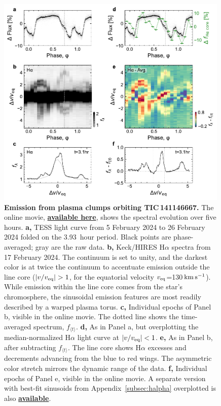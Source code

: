 \documentclass[11pt,twocolumn,tighten]{aastex7}
\newcommand{\kms}{\ensuremath{\rm km\,s^{-1}}}
\begin{document}
\begin{figure}[!t]
  \centering
  \includegraphics[width=0.99\textwidth]{f3.pdf}
  \vspace{-0.3cm}
  \captionsetup{labelformat=moviefmt,labelsep=colon}
	\caption{\textbf{Emission from plasma clumps orbiting
TIC\,141146667.}
  The online movie,
  \href{https://lgbouma.com/movies/TIC141146667_sixpanel.mp4}{{\bf
  available here}},
  shows the spectral evolution over five hours.
  {\bf a,} TESS light curve from 5 February 2024 to 26
  February 2024 folded on the 3.93\ hour period.  Black
  points are phase-averaged; gray are the raw data.
  {\bf b,} Keck/HIRES H$\alpha$ spectra from 17 February 2024.
  The continuum is set to unity, and the darkest color is at twice the
  continuum to accentuate emission outside the line core ($|v/v_{\rm
  eq}|>1$, for the equatorial velocity $v_{\rm eq}$=130\,\kms).  While
  emission within the line core comes from the star's chromosphere, the
  sinusoidal emission features are most readily described by a warped
  plasma torus.
  {\bf c,} Individual epochs of Panel b, visible in the online movie.
  The dotted line shows the time-averaged spectrum, $f_{\langle t
  \rangle}$.
  {\bf d,} As in Panel a, but overplotting the
  median-normalized H$\alpha$ light curve at $|v/v_{\rm eq}|<1$.
  {\bf e,} As in Panel b, after subtracting $f_{\langle t
  \rangle}$.  The line core shows H$\alpha$ excesses and decrements
  advancing from the blue to red wings.
  The asymmetric color stretch mirrors the dynamic range of the data.
  {\bf f,} Individual epochs of Panel e, visible in the online
  movie.  A separate version with best-fit sinusoids from
  Appendix~\ref{subsec:halpha} overplotted is also
  \href{https://lgbouma.com/movies/TIC141146667_sixpanel_sinusoids.mp4}{{\bf
  available}}.}
  \label{fig:spec}
\end{figure}
\end{document}
